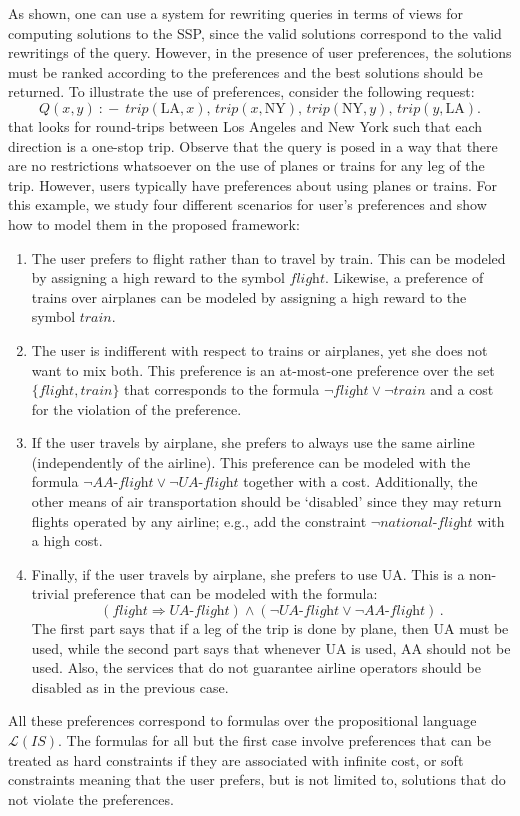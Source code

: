 \documentclass{llncs}
\newcommand{\qrule}{:\!\!-}
\renewcommand{\L}{\mathcal{L}}
\newcommand{\trip}{\textit{trip}}
\newcommand{\AAflight}{\textit{AA-flight}}
\newcommand{\UAflight}{\textit{UA-flight}}
\newcommand{\flight}{\textit{flight}}
\newcommand{\train}{\textit{train}}
\renewcommand{\AA}{\text{AA}}
\newcommand{\UA}{\text{UA}}
\newcommand{\NY}{\text{NY}}
\newcommand{\LA}{\text{LA}}
\newcommand{\nationaltlight}{\textit{national-flight}}
\begin{document}
As shown, one can use a system for rewriting queries in terms of views for
computing solutions to the SSP, since the valid solutions correspond to the
valid rewritings of the query.
However, in the presence of user preferences, the solutions must be ranked
according to the preferences and the best solutions should be returned.
To illustrate the use of preferences, consider the following request:
\[ Q(x,y)\ \qrule\ \trip(\LA,x),\,\trip(x,\NY),\,\trip(\NY,y),\,\trip(y,\LA). \]
that looks for round-trips between Los Angeles and New York such that
each direction is a one-stop trip. Observe that the query is posed in 
a way that there are no restrictions whatsoever on the use of planes or
trains for any leg of the trip. However, users typically have preferences
about using planes or trains.
For this example, we study four different scenarios for user's preferences
and show how to model them in the proposed framework:
\begin{enumerate}[P1.]
\item The user prefers to flight rather than to travel by train. This can be
      modeled by assigning a high reward to the symbol $\flight$. Likewise, a
      preference of trains over airplanes can be modeled by assigning a high
      reward to the symbol $\train$.
\item The user is indifferent with respect to trains or airplanes, yet
      she does not want to mix both. This preference is an at-most-one preference
      over the set $\{\flight,\train\}$ that corresponds to the formula
      $\neg\flight \lor \neg\train$ and a cost for the violation of the
      preference.
\item If the user travels by airplane, she prefers to always use the same
      airline (independently of the airline). This preference can be modeled
      with the formula $\neg\AAflight \lor \neg\UAflight$ together with a
      cost. Additionally, the other means of air transportation should be
      `disabled' since they may return flights operated by any airline;
      e.g., add the constraint $\neg\nationaltlight$ with a high cost.
\item Finally, if the user travels by airplane, she prefers to use $\UA$.
      This is a non-trivial preference that can be modeled with the formula:
\[ (\flight \Rightarrow \UAflight) \land (\neg\UAflight \lor \neg\AAflight)\,. \]
      The first part says that if a leg of the trip is done by plane, then $\UA$
      must be used, while the second part says that whenever $\UA$ is used,
      $\AA$ should not be used. Also, the services that do not guarantee
      airline operators should be disabled as in the previous case.
\end{enumerate}
All these preferences correspond to formulas over the propositional language
$\L(IS)$. The formulas for all but the first case involve preferences that can be
treated as hard constraints if they are associated with infinite cost, or soft
constraints meaning that the user prefers, but is not limited to, solutions
that do not violate the preferences.
\end{document}
